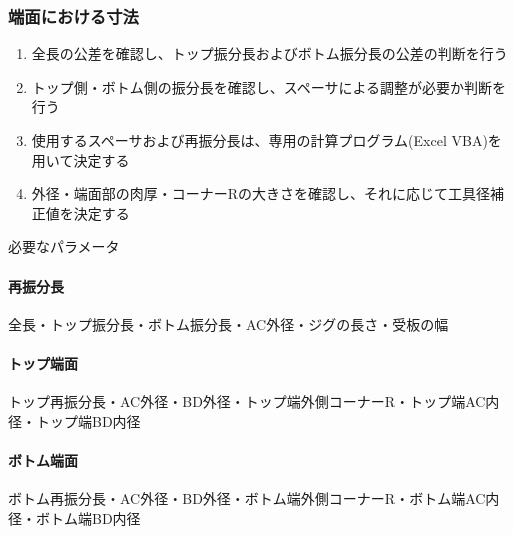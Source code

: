 \subsubsection{端面における寸法}
\begin{enumerate}
\item {}全長の公差を確認し、トップ振分長およびボトム振分長の公差の判断を行う
\item トップ側・ボトム側の振分長を確認し、スペーサによる調整が必要か判断を行う
\item 使用するスペーサおよび再振分長は、専用の計算プログラム(Excel VBA)を用いて決定する
\item {}外径・端面部の肉厚・コーナーRの大きさを確認し、それに応じて工具径補正値を決定する
\end{enumerate}
\begin{Parameter}{必要なパラメータ}
\paragraph*{再振分長}
全長・トップ振分長・ボトム振分長・AC外径・ジグの長さ・受板の幅
\tcbline*
\paragraph*{トップ端面}
トップ再振分長・AC外径・BD外径・トップ端外側コーナーR・トップ端AC内径・トップ端BD内径
\tcbline*
\paragraph*{ボトム端面}
ボトム再振分長・AC外径・BD外径・ボトム端外側コーナーR・ボトム端AC内径・ボトム端BD内径
\end{Parameter}

